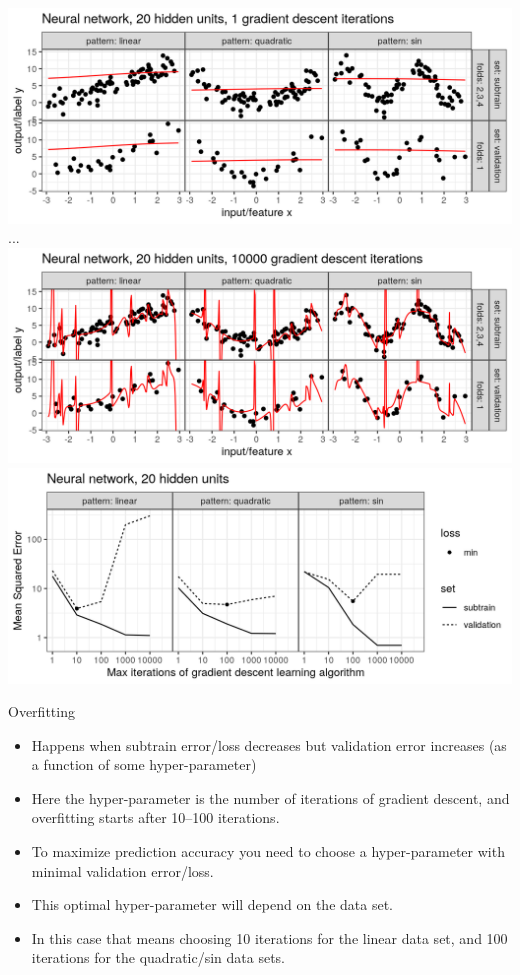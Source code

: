 \documentclass{article}
\begin{document}
  \includegraphics[width=\textwidth]{figure-overfitting-pred-units=20-maxit=1.png}
  ...
  \includegraphics[width=\textwidth]{figure-overfitting-pred-units=20-maxit=10000.png}
  \includegraphics[width=\textwidth]{figure-overfitting-data-loss-20.png}
  
{Overfitting}
\begin{itemize}
\item Happens when subtrain error/loss decreases but validation error
  increases (as a function of some hyper-parameter)
\item Here the hyper-parameter is the number of iterations of
  gradient descent, and overfitting starts after 10--100 iterations.
\item To maximize prediction accuracy you need to choose a
  hyper-parameter with minimal validation error/loss.
\item This optimal hyper-parameter will depend on the data set.
\item In this case that means choosing 10 iterations for the linear
  data set, and 100 iterations for the quadratic/sin data sets.
\end{itemize}
\end{document}
